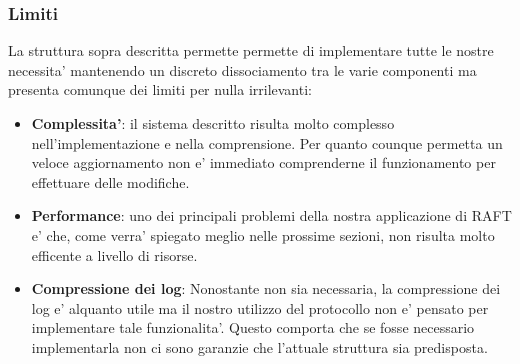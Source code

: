 \subsubsection{Limiti}
La struttura sopra descritta permette permette di implementare tutte le nostre necessita' 
mantenendo un discreto dissociamento tra le varie componenti ma presenta comunque dei limiti
per nulla irrilevanti:
\begin{itemize}
    \item \textbf{Complessita'}: il sistema descritto risulta molto complesso nell'implementazione 
        e nella comprensione. Per quanto counque permetta un veloce aggiornamento non e' 
        immediato comprenderne il funzionamento per effettuare delle modifiche.
    \item \textbf{Performance}: uno dei principali problemi della nostra applicazione di RAFT 
        e' che, come verra' spiegato meglio nelle prossime sezioni, non risulta molto efficente
        a livello di risorse. 
    \item \textbf{Compressione dei log}: Nonostante non sia necessaria, la compressione dei log
        e' alquanto utile ma il nostro utilizzo del protocollo non e' pensato per implementare
        tale funzionalita'. Questo comporta che se fosse necessario implementarla
        non ci sono garanzie che l'attuale struttura sia predisposta.
\end{itemize}

